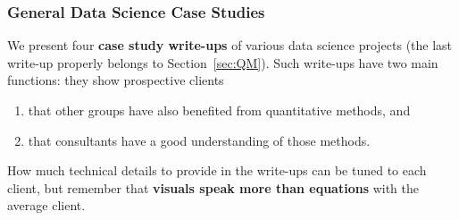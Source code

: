 

\subsubsection{General Data Science Case Studies}
We present four \textbf{case study write-ups} of various data science projects (the last write-up properly belongs to Section~\ref{sec:QM}). Such write-ups have two main functions: they show prospective clients 
\begin{enumerate}[noitemsep]
    \item that other groups have also benefited from quantitative methods, and 
    \item that consultants have a good understanding of those methods.
\end{enumerate}
How much technical details to provide in the write-ups can be tuned to each client, but remember that \textbf{visuals speak more than equations} with the average client.
